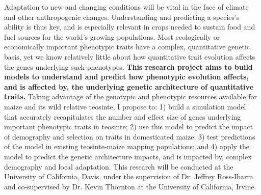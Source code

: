 Adaptation to new and changing conditions will be vital in the face of climate and other anthropogenic changes. Understanding and predicting a species's ability is thus key, and is especially relevant in crops needed to sustain food and fuel sources for the world's growing populations.  Most ecologically or economically important phenotypic traits have a complex, quantitative genetic basis, yet we know relatively little about how quantitative trait evolution affects the genes underlying such phenotypes. \textbf{This research project aims to build models to understand and predict how phenotypic evolution affects, and is affected by, the underlying genetic architecture of quantitative traits.}  
Taking advantage of the genotypic and phenotypic resources available for maize and its wild relative teosinte, I propose to: 1) build a simulation model that accurately recapitulates the number and effect size of genes underlying important phenotypic traits in teosinte; 2) use this model to predict the impact of demography and selection on traits in domesticated maize; 3) test predictions of the model in existing teosinte-maize mapping populations; and 4) apply the model to predict the genetic architecture impacts, and is impacted by, complex demography and local adaptation.
This research will be conducted at the University of California, Davis, under the supervision of Dr. Jeffrey Ross\--Ibarra and co-supervised by Dr. Kevin Thornton at the University of California, Irvine.

